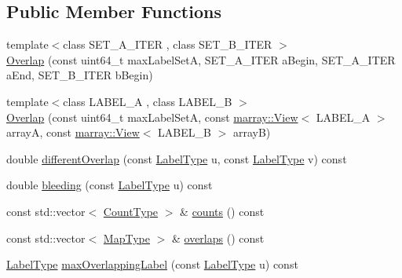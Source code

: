 \subsection*{Public Member Functions}
\begin{DoxyCompactItemize}
\item 
{\footnotesize template$<$class S\+E\+T\+\_\+\+A\+\_\+\+I\+T\+E\+R , class S\+E\+T\+\_\+\+B\+\_\+\+I\+T\+E\+R $>$ }\\\hyperlink{classnifty_1_1ground__truth_1_1Overlap_aedaa9af95b736f17f2dbfe0eff4c09bf}{Overlap} (const uint64\+\_\+t max\+Label\+Set\+A, S\+E\+T\+\_\+\+A\+\_\+\+I\+T\+E\+R a\+Begin, S\+E\+T\+\_\+\+A\+\_\+\+I\+T\+E\+R a\+End, S\+E\+T\+\_\+\+B\+\_\+\+I\+T\+E\+R b\+Begin)
\item 
{\footnotesize template$<$class L\+A\+B\+E\+L\+\_\+\+A , class L\+A\+B\+E\+L\+\_\+\+B $>$ }\\\hyperlink{classnifty_1_1ground__truth_1_1Overlap_a0a40f259581e8a4d9e594fd1db23170a}{Overlap} (const uint64\+\_\+t max\+Label\+Set\+A, const \hyperlink{classandres_1_1View}{marray\+::\+View}$<$ L\+A\+B\+E\+L\+\_\+\+A $>$ array\+A, const \hyperlink{classandres_1_1View}{marray\+::\+View}$<$ L\+A\+B\+E\+L\+\_\+\+B $>$ array\+B)
\item 
double \hyperlink{classnifty_1_1ground__truth_1_1Overlap_adfacb68ed0047e88cbe3524ad664f02f}{different\+Overlap} (const \hyperlink{classnifty_1_1ground__truth_1_1Overlap_af14b9a872d3736d3115231866bc71612}{Label\+Type} u, const \hyperlink{classnifty_1_1ground__truth_1_1Overlap_af14b9a872d3736d3115231866bc71612}{Label\+Type} v) const 
\item 
double \hyperlink{classnifty_1_1ground__truth_1_1Overlap_ad4518e3941b75c18091cefa145a7ce2b}{bleeding} (const \hyperlink{classnifty_1_1ground__truth_1_1Overlap_af14b9a872d3736d3115231866bc71612}{Label\+Type} u) const 
\item 
const std\+::vector$<$ \hyperlink{classnifty_1_1ground__truth_1_1Overlap_ab8f82b8fef890dc3d7b69da0cc768c76}{Count\+Type} $>$ \& \hyperlink{classnifty_1_1ground__truth_1_1Overlap_a5c530575bb3d2657948424263dfcc3a9}{counts} () const 
\item 
const std\+::vector$<$ \hyperlink{classnifty_1_1ground__truth_1_1Overlap_a6866ee8c988dd21d3fbd6ee5c2e836bf}{Map\+Type} $>$ \& \hyperlink{classnifty_1_1ground__truth_1_1Overlap_aa2bacf84117795f844bccbd698afada2}{overlaps} () const 
\item 
\hyperlink{classnifty_1_1ground__truth_1_1Overlap_af14b9a872d3736d3115231866bc71612}{Label\+Type} \hyperlink{classnifty_1_1ground__truth_1_1Overlap_a0e7d6a73dae11d4a87e379add45a9a4f}{max\+Overlapping\+Label} (const \hyperlink{classnifty_1_1ground__truth_1_1Overlap_af14b9a872d3736d3115231866bc71612}{Label\+Type} u) const 

\end{DoxyCompactItemize}
